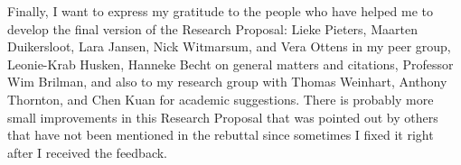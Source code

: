 \documentclass[../BachelorAssignment.tex]{subfiles}
\begin{document}
Finally, I want to express my gratitude to the people who have helped me to develop the final version of the Research Proposal: Lieke Pieters, Maarten Duikersloot, Lara Jansen, Nick Witmarsum, and Vera Ottens in my peer group, Leonie-Krab Husken, Hanneke Becht on general matters and citations, Professor Wim Brilman, and also to my research group with Thomas Weinhart, Anthony Thornton, and Chen Kuan for academic suggestions. There is probably more small improvements in this Research Proposal that was pointed out by others that have not been mentioned in the rebuttal since  sometimes I fixed it right after I received the feedback. 
\end{document}

